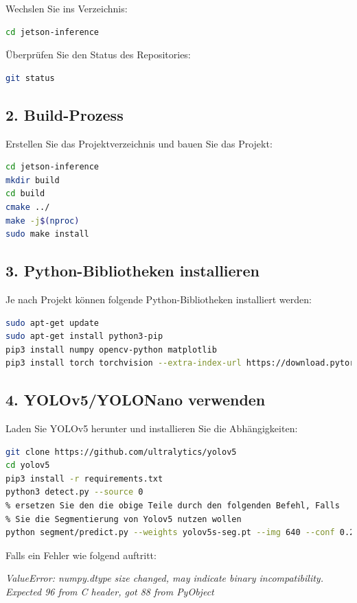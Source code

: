 \documentclass{article}
\begin{document}
Wechslen Sie ins Verzeichnis:
\begin{lstlisting}[language=bash]
cd jetson-inference
\end{lstlisting}

Überprüfen Sie den Status des Repositories:
\begin{lstlisting}[language=bash]
git status
\end{lstlisting}

\subsection*{2. Build-Prozess}
Erstellen Sie das Projektverzeichnis und bauen Sie das Projekt:
\begin{lstlisting}[language=bash]
cd jetson-inference
mkdir build
cd build
cmake ../
make -j$(nproc)
sudo make install
\end{lstlisting}

\subsection*{3. Python-Bibliotheken installieren}
Je nach Projekt können folgende Python-Bibliotheken installiert werden:

\begin{lstlisting}[language=bash]
sudo apt-get update
sudo apt-get install python3-pip
pip3 install numpy opencv-python matplotlib
pip3 install torch torchvision --extra-index-url https://download.pytorch.org/whl/cu118
\end{lstlisting}

\subsection*{4. YOLOv5/YOLONano verwenden}
Laden Sie YOLOv5 herunter und installieren Sie die Abhängigkeiten:
\begin{lstlisting}[language=bash]
git clone https://github.com/ultralytics/yolov5 
cd yolov5
pip3 install -r requirements.txt
python3 detect.py --source 0 
% ersetzen Sie den die obige Teile durch den folgenden Befehl, Falls
% Sie die Segmentierung von Yolov5 nutzen wollen
python segment/predict.py --weights yolov5s-seg.pt --img 640 --conf 0.25 --source 0

\end{lstlisting}

Falls ein Fehler wie folgend auftritt: 

\textit{ValueError: numpy.dtype size changed, may indicate binary incompatibility. Expected 96 from C header, got 88 
\indent from PyObject}
\end{document}
